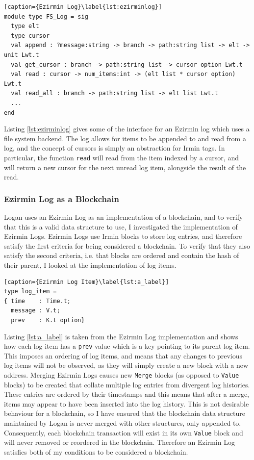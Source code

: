 \documentclass[12pt,a4paper,twoside,openright]{report}
\begin{document}
	\begin{lstlisting}[caption={Ezirmin Log}\label{lst:ezirminlog}]
module type FS_Log = sig
  type elt 
  type cursor 
  val append : ?message:string -> branch -> path:string list -> elt -> unit Lwt.t
  val get_cursor : branch -> path:string list -> cursor option Lwt.t
  val read : cursor -> num_items:int -> (elt list * cursor option) Lwt.t
  val read_all : branch -> path:string list -> elt list Lwt.t
  ...
end
	\end{lstlisting}

	Listing \ref{lst:ezirminlog} gives some of the interface for an Ezirmin log which uses a file system backend.
	The log allows for items to be appended to and read from a log, and the concept of cursors is simply an abstraction for Irmin tags.
	In particular, the function \texttt{read} will read from the item indexed by a cursor, and will return a new cursor for the next unread log item, alongside the result of the read.

	\subsubsection*{Ezirmin Log as a Blockchain}
	Logan uses an Ezirmin Log as an implementation of a blockchain, and to verify that this is a valid data structure to use, I investigated the implementation of Ezirmin Logs.
	Ezirmin Logs use Irmin blocks to store log entries, and therefore satisfy the first criteria for being considered a blockchain. 
	To verify that they also satisfy the second criteria, i.e. that blocks are ordered and contain the hash of their parent, I looked at the implementation of log items.

	\begin{lstlisting}[caption={Ezirmin Log Item}\label{lst:a_label}]
type log_item =
{ time    : Time.t;
  message : V.t;
  prev    : K.t option}
	\end{lstlisting}

	Listing \ref{lst:a_label} is taken from the Ezirmin Log implementation and shows how each log item has a \texttt{prev} value which is a key pointing to its parent log item. 
	This imposes an ordering of log items, and means that any changes to previous log items will not be observed, as they will simply create a new block with a new address. 
	Merging Ezirmin Logs causes new \texttt{Merge} blocks (as opposed to \texttt{Value} blocks) to be created that collate multiple log entries from divergent log histories.
	These entries are ordered by their timestamps and this means that after a merge, items may appear to have been inserted into the log history.
	This is not desirable behaviour for a blockchain, so I have ensured that the blockchain data structure maintained by Logan is never merged with other structures, only appended to. 
	Consequently, each blockchain transaction will exist in its own \texttt{Value} block and will never removed or reordered in the blockchain.
	Therefore an Ezirmin Log satisfies both of my conditions to be considered a blockchain.
\end{document}
